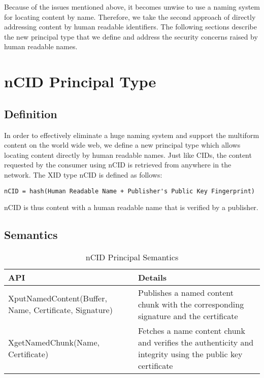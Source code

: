 Because of the issues mentioned above, it becomes unwise to use a
naming system for locating content by name. Therefore, we take the
second approach of directly addressing content by human readable
identifiers. The following sections describe the new principal type
that we define and address the security concerns raised by human
readable names.

\section{nCID Principal Type}

\subsection{Definition}

In order to effectively eliminate a huge naming system and support the
multiform content on the world wide web, we define a new principal
type which allows locating content directly by human readable
names. Just like CIDs, the content requested by the consumer using
nCID is retrieved from anywhere in the network. The XID type nCID is
defined as follows:

\begin{verbatim}
nCID = hash(Human Readable Name + Publisher's Public Key Fingerprint)
\end{verbatim}
nCID is thus content with a human readable name that is verified by a
publisher.

\subsection{Semantics}

\begin{table}
  \begin{center}
    \begin{tabular}
      {p{2in}  p{3in}}
      API & Details \\
      \hline
      XputNamedContent(Buffer, Name, Certificate, Signature) &
      Publishes a named content chunk with the corresponding signature
      and the certificate\\
      XgetNamedChunk(Name, Certificate) & Fetches a name content chunk
      and verifies the authenticity and integrity using the public key
      certificate\\
    \end{tabular}
  \end{center}
  \caption{nCID Principal Semantics}
  \label{tab:ncidapis}

\end{table}

